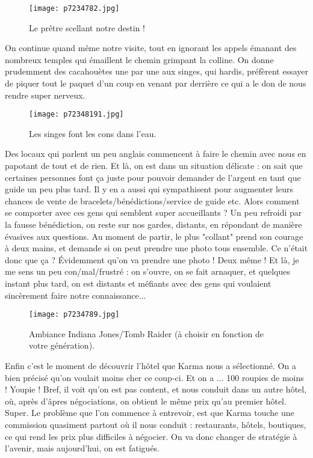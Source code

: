 \documentclass{book}
\begin{document}
\begin{figure}[h]
\centering
\texttt{[image: p7234782.jpg]}
\caption*{Le prêtre scellant notre destin !}
\end{figure}

On continue quand même notre visite, tout en ignorant les appels émanant des nombreux temples qui émaillent le chemin grimpant la colline. On donne prudemment des cacahouètes une par une aux singes, qui hardis, préfèrent essayer de piquer tout le paquet d'un coup en venant par derrière ce qui a le don de nous rendre super nerveux.


\begin{figure}[h]
\centering
\texttt{[image: p72348191.jpg]}
\caption*{Les singes font les cons dans l'eau.}
\end{figure}

Des locaux qui parlent un peu anglais commencent à faire le chemin avec nous en papotant de tout et de rien. Et là, on est dans un situation délicate : on sait que certaines personnes font ça juste pour pouvoir demander de l'argent en tant que guide un peu plus tard. Il y en a aussi qui sympathisent pour augmenter leurs chances de vente de bracelets/bénédictions/service de guide etc. Alors comment se comporter avec ces gens qui semblent super accueillants ? Un peu refroidi par la fausse bénédiction, on reste sur nos gardes, distants, en répondant de manière évasives aux questions. Au moment de partir, le plus "collant" prend son courage à deux mains, et demande si on peut prendre une photo tous ensemble. Ce n'était donc que ça ? Évidemment qu'on va prendre une photo ! Deux même ! Et là, je me sens un peu con/mal/frustré : on s'ouvre, on se fait arnaquer, et quelques instant plus tard, on est distants et méfiants avec des gens qui voulaient sincèrement faire notre connaissance...


\begin{figure}[h]
\centering
\texttt{[image: p7234789.jpg]}
\caption*{Ambiance Indiana Jones/Tomb Raider (à choisir en fonction de votre génération).}
\end{figure}

Enfin c'est le moment de découvrir l'hôtel que Karma nous a sélectionné. On a bien précisé qu'on voulait moins cher ce coup-ci. Et on a ... 100 roupies de moins ! Youpie ! Bref, il voit qu'on est pas content, et nous conduit dans un autre hôtel, où, après d'âpres négociations, on obtient le même prix qu'au premier hôtel. Super. Le problème que l'on commence à entrevoir, est que Karma touche une commission quasiment partout où il nous conduit : restaurants, hôtels, boutiques, ce qui rend les prix plus difficiles à négocier. On va donc changer de stratégie à l'avenir, mais aujourd'hui, on est fatigués.
\end{document}
